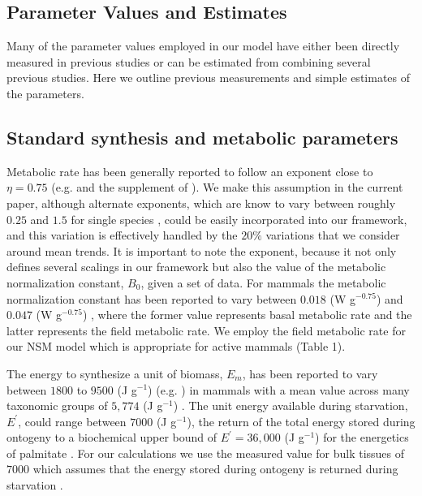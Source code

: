 \documentclass{pnastwo}
\begin{document}
\begin{article}

\section*{Parameter Values and Estimates}

Many of the parameter values employed in our model have either been directly measured in previous studies or can be estimated from combining several previous studies. Here we outline previous measurements and simple estimates of the parameters. 

\subsection*{Standard synthesis and metabolic parameters}

Metabolic rate has been generally reported to follow an exponent close to $\eta=0.75$ (e.g. \cite{West:2001bv,moses2008rmo} and the supplement of \cite{hou}). We make this assumption in the current paper, although alternate exponents, which are know to vary between roughly $0.25$ and $1.5$ for single species \cite{moses2008rmo}, could be easily incorporated into our framework, and this variation is effectively handled by the $20\%$ variations that we consider around mean trends. It is important to note the exponent, because it not only defines several scalings in our framework but also the value of the metabolic normalization constant, $B_{0}$, given a set of data.  For mammals the metabolic normalization constant has been reported to vary between $0.018$ (W g$^{-0.75}$) and $0.047$ (W g$^{-0.75}$) \cite{hou,West:2001bv}, where the former value represents basal metabolic rate and the latter represents the field metabolic rate. We employ the field metabolic rate for our NSM model which is appropriate for active mammals (Table 1).

The energy to synthesize a unit of biomass, $E_{m}$, has been reported to vary between $1800$ to $9500$ (J g$^{-1}$) (e.g. \cite{West:2001bv,moses2008rmo,hou}) in mammals with a mean value across many taxonomic groups of $5,774$ (J g$^{-1}$) \cite{moses2008rmo}. The unit energy available during starvation, $E^{\prime}$, could range between $7000$ (J g$^{-1}$), the return of the total energy stored during ontogeny \cite{hou} to a biochemical upper bound of $E^{\prime}=36,000$ (J g$^{-1}$) for the energetics of palmitate \cite{stryer,hou}. For our calculations we use the measured value for bulk tissues of $7000$ which assumes that the energy stored during ontogeny is returned during starvation \cite{hou}. 


\end{article}
\end{document}
